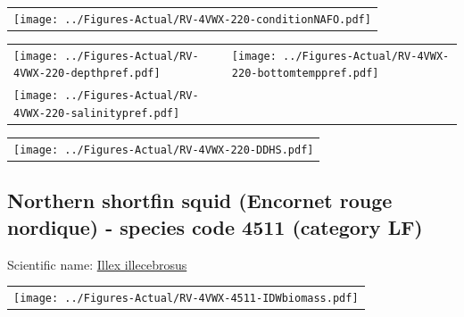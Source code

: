 \documentclass[12pt]{article}\usepackage[]{graphicx}\usepackage[]{color}
\begin{document}
\vspace{1cm}
\begin{minipage}{1.0\textwidth}
 \begin{tabular}{c}
\texttt{[image: ../Figures-Actual/RV-4VWX-220-conditionNAFO.pdf]} \\ 
\end{tabular} 
\end{minipage}
\clearpage
\begin{minipage}{1.0\textwidth}
 \begin{tabular}[t]{m{3in}m{3in}}
\texttt{[image: ../Figures-Actual/RV-4VWX-220-depthpref.pdf]} & 
\texttt{[image: ../Figures-Actual/RV-4VWX-220-bottomtemppref.pdf]} \\ 
\texttt{[image: ../Figures-Actual/RV-4VWX-220-salinitypref.pdf]} & 
 \\ 
\end{tabular} 
\end{minipage}
\newline

\vspace{1cm}
\begin{minipage}{1.0\textwidth}
 \begin{tabular}{c}
\texttt{[image: ../Figures-Actual/RV-4VWX-220-DDHS.pdf]} \\ 
\end{tabular} 
\end{minipage}
\clearpage

\renewcommand\thefigure{\thesubsection\Alph{figure}}

\setcounter{figure}{0}

\hypertarget{sec:4511}{%
\subsection{Northern shortfin squid (Encornet rouge nordique) - species code 4511 (category LF)}\label{sec:4511}}

  


Scientific name: \href{http://www.marinespecies.org/aphia.php?p=taxdetails\&id=153087}{Illex illecebrosus} \newline
\begin{minipage}{1.0\textwidth}
 \begin{tabular}{c}
\texttt{[image: ../Figures-Actual/RV-4VWX-4511-IDWbiomass.pdf]} \\ 
\end{tabular} 
\end{minipage}
\newline
\end{document}
